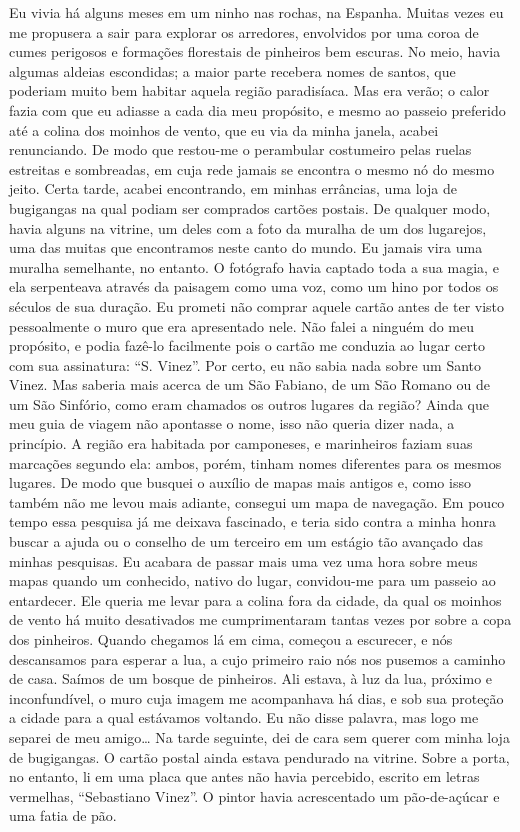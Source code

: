 Eu vivia há alguns meses em um ninho nas rochas, na Espanha. Muitas
vezes eu me propusera a sair para explorar os arredores, envolvidos por
uma coroa de cumes perigosos e formações florestais de pinheiros bem
escuras. No meio, havia algumas aldeias escondidas; a maior parte
recebera nomes de santos, que poderiam muito bem habitar aquela região
paradisíaca. Mas era verão; o calor fazia com que eu adiasse a cada dia
meu propósito, e mesmo ao passeio preferido até a colina dos moinhos de
vento, que eu via da minha janela, acabei renunciando. De modo que
restou-me o perambular costumeiro pelas ruelas estreitas e sombreadas,
em cuja rede jamais se encontra o mesmo nó do mesmo jeito. Certa tarde,
acabei encontrando, em minhas errâncias, uma loja de bugigangas na qual
podiam ser comprados cartões postais. De qualquer modo, havia alguns na
vitrine, um deles com a foto da muralha de um dos lugarejos, uma das
muitas que encontramos neste canto do mundo. Eu jamais vira uma muralha
semelhante, no entanto. O fotógrafo havia captado toda a sua magia, e
ela serpenteava através da paisagem como uma voz, como um hino por todos
os séculos de sua duração. Eu prometi não comprar aquele cartão antes de
ter visto pessoalmente o muro que era apresentado nele. Não falei a
ninguém do meu propósito, e podia fazê-lo facilmente pois o cartão me
conduzia ao lugar certo com sua assinatura: ``S. Vinez''. Por certo, eu
não sabia nada sobre um Santo Vinez. Mas saberia mais acerca de um São
Fabiano, de um São Romano ou de um São Sinfório, como eram chamados os
outros lugares da região? Ainda que meu guia de viagem não apontasse o
nome, isso não queria dizer nada, a princípio. A região era habitada por
camponeses, e marinheiros faziam suas marcações segundo ela: ambos,
porém, tinham nomes diferentes para os mesmos lugares. De modo que
busquei o auxílio de mapas mais antigos e, como isso também não me levou
mais adiante, consegui um mapa de navegação. Em pouco tempo essa
pesquisa já me deixava fascinado, e teria sido contra a minha honra
buscar a ajuda ou o conselho de um terceiro em um estágio tão avançado
das minhas pesquisas. Eu acabara de passar mais uma vez uma hora sobre
meus mapas quando um conhecido, nativo do lugar, convidou-me para um
passeio ao entardecer. Ele queria me levar para a colina fora da cidade,
da qual os moinhos de vento há muito desativados me cumprimentaram
tantas vezes por sobre a copa dos pinheiros. Quando chegamos lá em cima,
começou a escurecer, e nós descansamos para esperar a lua, a cujo
primeiro raio nós nos pusemos a caminho de casa. Saímos de um bosque de
pinheiros. Ali estava, à luz da lua, próximo e inconfundível, o muro
cuja imagem me acompanhava há dias, e sob sua proteção a cidade para a
qual estávamos voltando. Eu não disse palavra, mas logo me separei de
meu amigo\ldots{} Na tarde seguinte, dei de cara sem querer com minha loja de
bugigangas. O cartão postal ainda estava pendurado na vitrine. Sobre a
porta, no entanto, li em uma placa que antes não havia percebido,
escrito em letras vermelhas, ``Sebastiano Vinez''. O pintor havia
acrescentado um pão-de-açúcar e uma fatia de pão.

